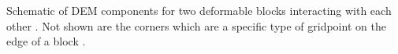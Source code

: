 \label{fig:dem} Schematic of DEM components for two deformable blocks interacting with each other \cite{_udec_2011}. Not shown are the corners which are a specific type of gridpoint on the edge of a block .
